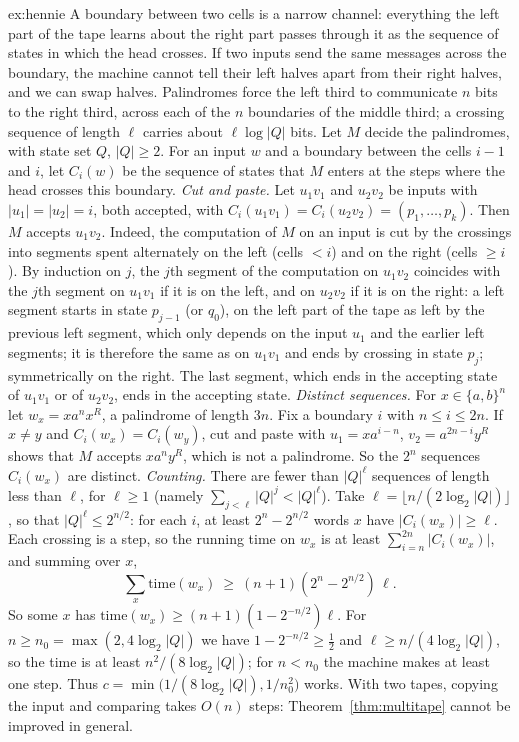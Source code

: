 \begin{solution}{ex:hennie}
\idea A boundary between two cells is a narrow channel: everything the left part of the tape learns about the right part passes through it as the sequence of states in which the head crosses. If two inputs send the same messages across the boundary, the machine cannot tell their left halves apart from their right halves, and we can swap halves. Palindromes force the left third to communicate $n$ bits to the right third, across each of the $n$ boundaries of the middle third; a crossing sequence of length $\ell$ carries about $\ell\log|Q|$ bits.
\writeup Let $M$ decide the palindromes, with state set $Q$, $|Q|\ge2$. For an input $w$ and a boundary between the cells $i-1$ and $i$, let $C_i(w)$ be the sequence of states that $M$ enters at the steps where the head crosses this boundary.
\emph{Cut and paste.} Let $u_1v_1$ and $u_2v_2$ be inputs with $|u_1|=|u_2|=i$, both accepted, with $C_i(u_1v_1)=C_i(u_2v_2)=(p_1,\dots,p_k)$. Then $M$ accepts $u_1v_2$. Indeed, the computation of $M$ on an input is cut by the crossings into segments spent alternately on the left (cells $<i$) and on the right (cells $\ge i$). By induction on $j$, the $j$th segment of the computation on $u_1v_2$ coincides with the $j$th segment on $u_1v_1$ if it is on the left, and on $u_2v_2$ if it is on the right: a left segment starts in state $p_{j-1}$ (or $q_0$), on the left part of the tape as left by the previous left segment, which only depends on the input $u_1$ and the earlier left segments; it is therefore the same as on $u_1v_1$ and ends by crossing in state $p_j$; symmetrically on the right. The last segment, which ends in the accepting state of $u_1v_1$ or of $u_2v_2$, ends in the accepting state.
\emph{Distinct sequences.} For $x\in\{a,b\}^n$ let $w_x=xa^nx^R$, a palindrome of length $3n$. Fix a boundary $i$ with $n\le i\le2n$. If $x\ne y$ and $C_i(w_x)=C_i(w_y)$, cut and paste with $u_1=xa^{i-n}$, $v_2=a^{2n-i}y^R$ shows that $M$ accepts $xa^ny^R$, which is not a palindrome. So the $2^n$ sequences $C_i(w_x)$ are distinct.
\emph{Counting.} There are fewer than $|Q|^\ell$ sequences of length less than $\ell$, for $\ell\ge1$ (namely $\sum_{j<\ell}|Q|^j<|Q|^\ell$). Take $\ell=\lfloor n/(2\log_2|Q|)\rfloor$, so that $|Q|^\ell\le2^{n/2}$: for each $i$, at least $2^n-2^{n/2}$ words $x$ have $|C_i(w_x)|\ge\ell$. Each crossing is a step, so the running time on $w_x$ is at least $\sum_{i=n}^{2n}|C_i(w_x)|$, and summing over $x$,
\[
\sum_x\mathrm{time}(w_x)\ \ge\ (n+1)(2^n-2^{n/2})\,\ell.
\]
So some $x$ has $\mathrm{time}(w_x)\ge(n+1)(1-2^{-n/2})\ell$. For $n\ge n_0=\max(2,4\log_2|Q|)$ we have $1-2^{-n/2}\ge\frac12$ and $\ell\ge n/(4\log_2|Q|)$, so the time is at least $n^2/(8\log_2|Q|)$; for $n<n_0$ the machine makes at least one step. Thus $c=\min\bigl(1/(8\log_2|Q|),1/n_0^2\bigr)$ works. With two tapes, copying the input and comparing takes $O(n)$ steps: Theorem~\ref{thm:multitape} cannot be improved in general.
\end{solution}

